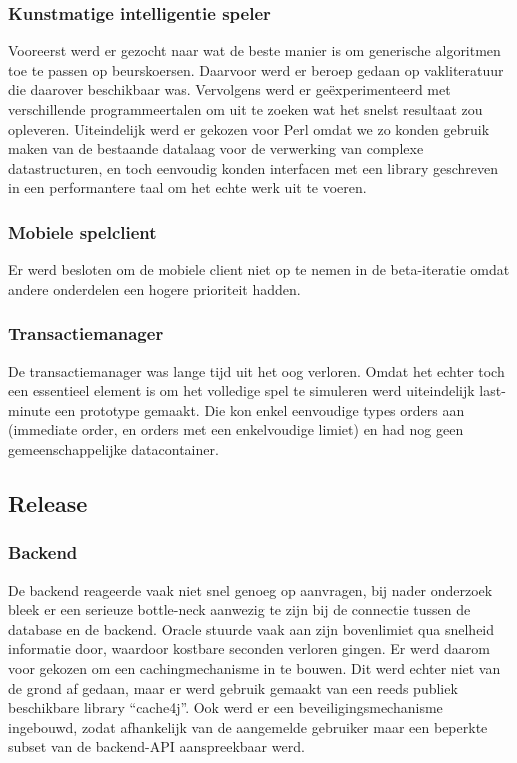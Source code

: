 \subsubsection{Kunstmatige intelligentie speler}
Vooreerst werd er gezocht naar wat de beste manier is om generische algoritmen toe te passen op beurskoersen. Daarvoor werd er beroep gedaan op vakliteratuur die daarover beschikbaar was. Vervolgens werd er ge\"experimenteerd met verschillende programmeertalen om uit te zoeken wat het snelst resultaat zou opleveren. Uiteindelijk werd er gekozen voor Perl omdat we zo konden gebruik maken van de bestaande datalaag voor de verwerking van complexe datastructuren, en toch eenvoudig konden interfacen met een library geschreven in een performantere taal om het echte werk uit te voeren.

\subsubsection{Mobiele spelclient}
Er werd besloten om de mobiele client niet op te nemen in de beta-iteratie omdat andere onderdelen een hogere prioriteit hadden.

\subsubsection{Transactiemanager}
De transactiemanager was lange tijd uit het oog verloren. Omdat het echter toch een essentieel element is om het volledige spel te simuleren werd uiteindelijk last-minute een prototype gemaakt. Die kon enkel eenvoudige types orders aan (immediate order, en orders met een enkelvoudige limiet) en had nog geen gemeenschappelijke datacontainer.

\subsection{Release}

\subsubsection{Backend}
De backend reageerde vaak niet snel genoeg op aanvragen, bij nader onderzoek bleek er een serieuze bottle-neck aanwezig te zijn bij de connectie tussen de database en de backend. Oracle stuurde vaak aan zijn bovenlimiet qua snelheid informatie door, waardoor kostbare seconden verloren gingen. Er werd daarom voor gekozen om een cachingmechanisme in te bouwen. Dit werd echter niet van de grond af gedaan, maar er werd gebruik gemaakt van een reeds publiek beschikbare library ``cache4j''.
Ook werd er een beveiligingsmechanisme ingebouwd, zodat afhankelijk van de aangemelde gebruiker maar een beperkte subset van de backend-API aanspreekbaar werd.

